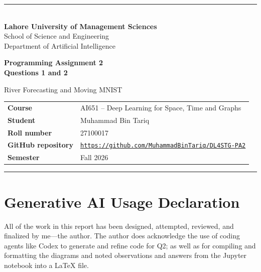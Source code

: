\documentclass[11pt]{article}
\newcommand{\StudentName}{Muhammad Bin Tariq}
\newcommand{\StudentRoll}{27100017}
\newcommand{\RepositoryURL}{https://github.com/MuhammadBinTariq/DL4STG-PA2}
\begin{document}
\hypersetup{pageanchor=false}
\begin{titlepage}
\thispagestyle{empty}
\vspace*{0.55in}
{\color{teal}\rule{\textwidth}{2.2pt}}\\[1.0em]
{\Large\bfseries Lahore University of Management Sciences}\\[0.35em]
{\large School of Science and Engineering}\\[0.15em]
{\large Department of Artificial Intelligence}
\vfill
{\fontsize{27}{32}\selectfont\bfseries\color{navy}Programming Assignment 2\\[0.25em]Questions 1 and 2\par}
\vspace{0.8em}
{\Large River Forecasting and Moving MNIST\par}
\vfill
\begin{tabularx}{\textwidth}{@{}>{\bfseries}p{}X@{}}
Course & AI651 -- Deep Learning for Space, Time and Graphs \\
Student & \StudentName \\
Roll number & \StudentRoll \\
GitHub repository & \href{\RepositoryURL}{\nolinkurl{\RepositoryURL}} \\
Semester & Fall 2026 \\
\end{tabularx}
\vfill
{\color{teal}\rule{\textwidth}{2.2pt}}
\end{titlepage}
\hypersetup{pageanchor=true}

\clearpage

\clearpage
\section*{Generative AI Usage Declaration}
All of the work in this report has been designed, attempted, reviewed, and finalized by me---the author. The author does acknowledge the use of coding agents like Codex to generate and refine code for Q2; as well as for compiling and formatting the diagrams and noted observations and answers from the Jupyter notebook into a LaTeX file.
\end{document}
